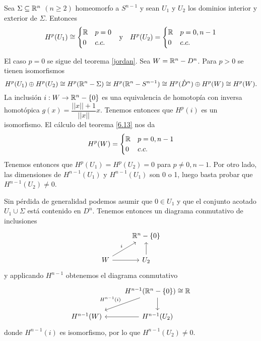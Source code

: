 \documentclass[CV.tex]{subfiles}
\begin{document}
\begin{prop}\label{7.16}
Sea $\Sigma\subseteq\mathbb{R}^n$ $(n\geq 2)$ homeomorfo a $S^{n-1}$ y sean $U_1$ y $U_2$ los dominios interior y exterior de $\Sigma$. Entonces
\begin{align*}
&H^p(U_1)\cong \begin{cases}
\mathbb{R} & p=0\\
0 & c.c.
\end{cases} &\text{y}& & H^p(U_2)=\begin{cases}
\mathbb{R} & p=0,n-1\\
0 & c.c.
\end{cases}
\end{align*}
\end{prop}
\begin{dem}
El caso $p=0$ se sigue del teorema \ref{jordan}. Sea $W=\mathbb{R}^n-D^n$. Para $p>0$ se tienen isomorfismos
\[
H^p(U_1)\oplus H^p(U_2)\cong H^p(\mathbb{R}^n-\Sigma)\cong H^p(\mathbb{R}^n-S^{n-1})\cong H^p(\mathring{D}^n)\oplus H^p(W)\cong H^p(W).
\]
La inclusión $i:W\to\mathbb{R}^n-\{0\}$ es una equivalencia de homotopía con inversa homotópica $g(x)=\dfrac{||x||+1}{||x||}x$. Tenemos entonces que $H^p(i)$ es un isomorfismo. El cálculo del teorema \ref{6.13} nos da
\[
H^p(W)=\begin{cases}
\mathbb{R} & p=0,n-1\\
0 & c.c.
\end{cases}
\]
Tenemos entonces que $H^p(U_1)=H^p(U_2)=0$ para $p\neq 0, n-1$. Por otro lado, las dimensiones de $H^{n-1}(U_1)$ y $H^{n-1}(U_1)$ son 0 o 1, luego basta probar que $H^{n-1}(U_2)\neq 0$. 

Sin pérdida de generalidad podemos asumir que $0\in U_1$ y que el conjunto acotado $U_1\cup\Sigma$ está contenido en $D^n$. Tenemos entonces un diagrama conmutativo de inclusiones
\[
\begin{tikzcd}
& \R^n-\{0\}\\
W\arrow[ur, "i"]\arrow[r] & U_2\arrow[u]
\end{tikzcd}
\]
y applicando $H^{n-1}$ obtenemos el diagrama conmutativo
\[
\begin{tikzcd}
& H^{n-1}(\R^n-\{0\})\cong\R\arrow[dl, "H^{n-1}(i)"']\arrow[d]\\
H^{n-1}(W)& H^{n-1}(U_2)\arrow[l] 
\end{tikzcd}
\]
donde $H^{n-1}(i)$ es isomorfismo, por lo que $H^{n-1}(U_2)\neq 0$.
\QED
\end{dem}
\end{document}

